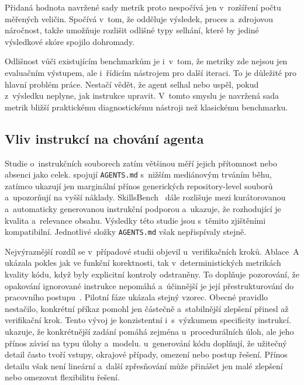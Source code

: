 Přidaná hodnota navržené sady metrik proto nespočívá jen v~rozšíření
počtu měřených veličin. Spočívá v~tom, že odděluje výsledek, proces
a~zdrojovou náročnost, takže umožňuje rozlišit odlišné typy selhání,
které by jediné výsledkové skóre spojilo dohromady.

Odlišnost vůči existujícím benchmarkům je i~v~tom, že metriky zde
nejsou jen evaluačním výstupem, ale i~řídicím nástrojem pro další
iteraci. To je důležité pro hlavní problém práce. Nestačí vědět, že
agent selhal nebo uspěl, pokud z~výsledku neplyne, jak instrukce
upravit. V~tomto smyslu je navržená sada metrik bližší praktickému
diagnostickému nástroji než klasickému benchmarku.

\subsection{Vliv instrukcí na chování agenta}

Studie o~instrukčních souborech zatím většinou měří jejich přítomnost
nebo absenci jako celek. \textcite{lulla2026} spojují
\texttt{AGENTS.md} s~nižším mediánovým trváním běhu, zatímco \textcite{gloaguen2025agentsmd} ukazují jen marginální přínos
generických repository-level souborů a~upozorňují na vyšší náklady.
SkillsBench~\cite{skillsbench2025} dále rozlišuje mezi kurátorovanou
a~automaticky generovanou instrukční podporou a~ukazuje, že rozhodující
je kvalita a~relevance obsahu. Výsledky této studie jsou s~těmito
zjištěními kompatibilní. Jednotlivé složky \texttt{AGENTS.md} však
nepřispívaly stejně.

Nejvýraznější rozdíl se v~případové studii objevil u~verifikačních
kroků. Ablace~A ukázala pokles jak ve funkční korektnosti, tak
v~deterministických metrikách kvality kódu, když byly explicitní
kontroly odstraněny.
To doplňuje pozorování, že opakování ignorované instrukce nepomáhá
a~účinnější je její přestrukturování do pracovního
postupu~\cite{breunig2025}. Pilotní fáze ukázala stejný vzorec.
Obecné pravidlo nestačilo, konkrétní příkaz pomohl jen
částečně a~stabilnější zlepšení přinesl až verifikační krok. Tento
vývoj je konzistentní i~s~výzkumem specificity instrukcí.
\textcite{kim2025detail} ukazuje, že konkrétnější zadání pomáhá
zejména u~procedurálních úloh, ale jeho přínos závisí na typu úlohy
a~modelu. \textcite{zi2025specificity} u~generování kódu doplňují,
že užitečný detail často tvoří vstupy, okrajové případy, omezení
nebo postup řešení. Přínos detailu však není lineární a~další
zpřesňování může přinášet jen malé zlepšení nebo omezovat flexibilitu
řešení.

